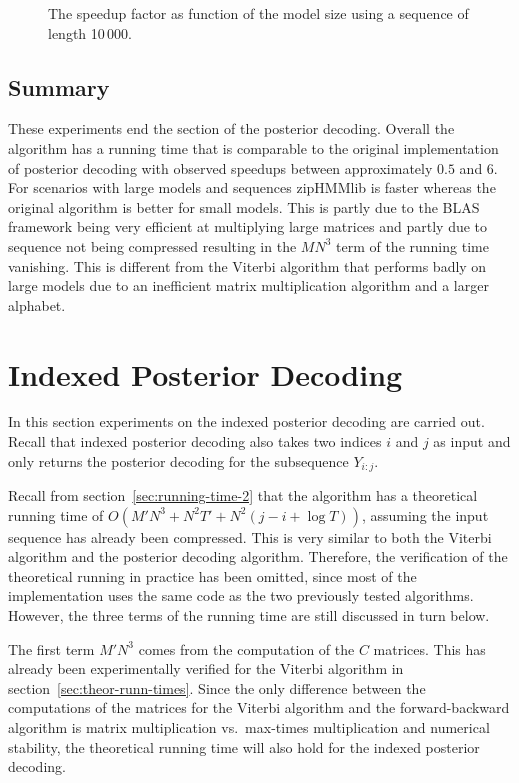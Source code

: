 \begin{figure}
  \centering
  
  \caption{The speedup factor as function of the model size using a sequence
    of length 10\,000.}
  \label{fig:posterior_speedup_vs_N}
\end{figure}

\subsection{Summary}

These experiments end the section of the posterior decoding. Overall the
algorithm has a running time that is comparable to the original implementation
of posterior decoding with observed speedups between approximately $0.5$ and 6.
For scenarios with large models and sequences zipHMMlib is faster whereas the
original algorithm is better for small models. This is partly due to the BLAS
framework being very efficient at multiplying large matrices and partly due to
sequence not being compressed resulting in the $MN^3$ term of the running time vanishing. This is different from the
Viterbi algorithm that performs badly on large models due to an inefficient
matrix multiplication algorithm and a larger alphabet.

\section{Indexed Posterior Decoding}

In this section experiments on the indexed posterior decoding are carried out.
Recall that indexed posterior decoding also takes two indices $i$ and $j$ as
input and only returns the posterior decoding for the subsequence $Y_{i:j}$.

Recall from section~\ref{sec:running-time-2} that the algorithm has a
theoretical running time of $O(M' N^3 + N^2 T' + N^2 (j - i + \log T))$,
assuming the input sequence has already been compressed. This is very similar
to both the Viterbi algorithm and the posterior decoding algorithm. Therefore,
the verification of the theoretical running in practice has been omitted, since
most of the implementation uses the same code as the two previously tested
algorithms. However, the three terms of the running time are still discussed in
turn below.

The first term $M' N^3$ comes from the computation of the $C$ matrices. This
has already been experimentally verified for the Viterbi algorithm in
section~\ref{sec:theor-runn-times}. Since the only difference between the
computations of the matrices for the Viterbi algorithm and the forward-backward
algorithm is matrix multiplication vs.\ max-times multiplication and numerical
stability, the theoretical running time will also hold for the indexed posterior
decoding.

